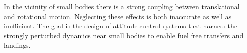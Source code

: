 \documentclass[11pt]{article} %
\begin{document}
In the vicinity of small bodies there is a strong coupling between translational and rotational motion.
Neglecting these effects is both inaccurate as well as inefficient.
The goal is the design of attitude control systems that harness the strongly perturbed dynamics near small bodies to enable fuel free transfers and landings.

%



\end{document}

